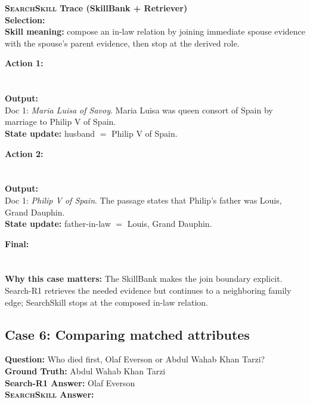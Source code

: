 \documentclass{article}
\newcommand{\Ours}{\textsc{SearchSkill}\xspace}
\begin{document}
\casedash
\noindent\textcolor{blue!75!black}{\textbf{\Ours Trace (SkillBank + Retriever)}}\\
\textbf{Selection:} \\
\textbf{Skill meaning:} compose an in-law relation by joining immediate spouse evidence with the spouse's parent evidence, then stop at the derived role.

\textbf{Action 1:}\\
\\
\\
\textbf{Output:}\\
Doc 1: \emph{Maria Luisa of Savoy}. Maria Luisa was queen consort of Spain by marriage to Philip V of Spain.\\
\textbf{State update:} husband \(=\) Philip V of Spain.

\textbf{Action 2:}\\
\\
\\
\textbf{Output:}\\
Doc 1: \emph{Philip V of Spain}. The passage states that Philip's father was Louis, Grand Dauphin.\\
\textbf{State update:} father-in-law \(=\) Louis, Grand Dauphin.

\textbf{Final:}\\
\\
\\
\textbf{Why this case matters:} The SkillBank makes the join boundary explicit. Search-R1 retrieves the needed evidence but continues to a neighboring family edge; SearchSkill stops at the composed in-law relation.
\casehr

\subsection{Case 6: Comparing matched attributes}
\casehr
\small
\noindent\textbf{Question:} Who died first, Olaf Everson or Abdul Wahab Khan Tarzi?\\
\textbf{Ground Truth:} Abdul Wahab Khan Tarzi\\
\textbf{Search-R1 Answer:} Olaf Everson\\
\textbf{\Ours Answer:} 
\end{document}
